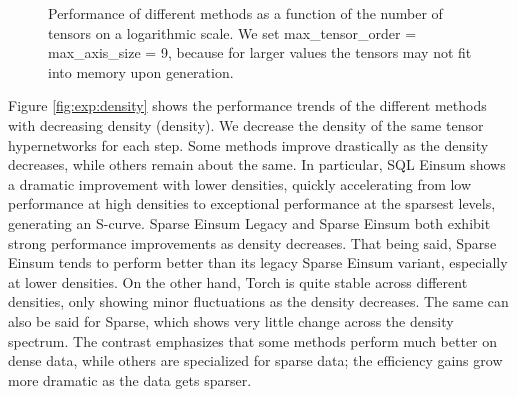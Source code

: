 \begin{figure}[H]
    \caption{Performance of different methods as a function of the number of tensors on a logarithmic scale. We set
        max\_tensor\_order = max\_axis\_size = 9, because for larger values the tensors may not
        fit into memory upon generation.}
    \label{fig:exp:num_tensors}
\end{figure}

\noindent
Figure \ref{fig:exp:density} shows the performance trends of the different methods with
decreasing density (density). We decrease the density of the same tensor hypernetworks for each step.
Some methods improve drastically as the density decreases, while others remain about the same. In
particular, SQL Einsum shows a dramatic improvement with lower densities, quickly accelerating from low
performance at high densities to exceptional performance at the sparsest levels, generating an
S-curve. Sparse Einsum Legacy and Sparse Einsum both exhibit strong performance improvements as
density decreases. That being said, Sparse Einsum tends to perform better than its legacy Sparse
Einsum variant, especially at lower densities. On the other hand, Torch is quite stable
across different densities, only showing minor fluctuations as the density decreases. The same can
also be said for Sparse, which shows very little change across the density spectrum. The contrast
emphasizes that some methods perform much better on dense data, while others are specialized
for sparse data; the efficiency gains grow more dramatic as the data gets sparser.

